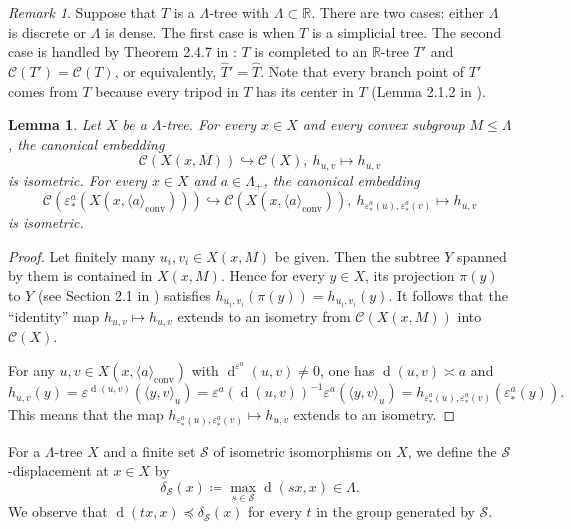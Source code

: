 \documentclass[12pt,nosumlimits,nonamelimits]{amsart}
\newtheorem{lem}[thm]{Lemma}
\theoremstyle{remark}
\newtheorem{rem}[thm]{Remark}
\theoremstyle{definition}
\newcommand{\IR}{\mathbb{R}}
\newcommand{\cC}{\mathcal{C}}
\newcommand{\cS}{\mathcal{S}}
\newcommand{\ve}{\varepsilon}
\newcommand{\La}{\Lambda}
\DeclareMathOperator{\dist}{d}
\DeclareMathOperator{\conv}{conv}
\newcommand{\ip}[1]{\mathopen{\langle}#1\mathclose{\rangle}}
\begin{document}
\begin{rem}\label{rem:Qtree}
Suppose that $T$ is a $\La$-tree with $\La\subset\IR$. 
There are two cases: either $\La$ is discrete or $\La$ is dense. 
The first case is when $T$ is a simplicial tree. 
The second case is handled by Theorem 2.4.7 in \cite{chiswell}: $T$ 
is completed to an $\IR$-tree $T'$ and 
$\cC(T') = \cC(T)$, or equivalently, $\hat{T}' = \hat{T}$.  
Note that every branch point of $T'$ comes from $T$ 
because every tripod in $T$ has its center in $T$ 
(Lemma 2.1.2 in \cite{chiswell}).
\end{rem}

\begin{lem}\label{lem:treeemb2}
Let $X$ be a $\La$-tree. 
For every $x\in X$ and every convex subgroup $M\le\La$, 
the canonical embedding
\[
\cC(X(x,M)) \hookrightarrow \cC(X),\ 
h_{u,v}\mapsto h_{u,v}
\]
is isometric. 
For every $x\in X$ and $a\in\La_+$, the canonical embedding
\[
\cC(\ve^a_* (X(x,\ip{a}_{\conv}))) \hookrightarrow \cC(X(x,\ip{a}_{\conv})),\ 
h_{\ve^a_*(u),\ve^a_*(v)}\mapsto h_{u,v}
\]
is isometric. 
\end{lem}
\begin{proof}
Let finitely many $u_i,v_i\in X(x,M)$ be given. 
Then the subtree $Y$ spanned by them is contained 
in $X(x,M)$. 
Hence for every $y \in X$, its projection $\pi(y)$ to $Y$ 
(see Section 2.1 in \cite{chiswell})
satisfies $h_{u_i,v_i}(\pi(y)) = h_{u_i,v_i}(y)$.
It follows that the ``identity'' map $h_{u,v}\mapsto h_{u,v}$ 
extends to an isometry from $\cC(X(x,M))$ 
into $\cC(X)$. 

For any $u,v\in X(x,\ip{a}_{\conv})$ with $\dist^{\ve^a}(u,v)\neq0$, 
one has $\dist(u,v)\asymp a$ and 
\[
h_{u,v}(y) = \ve^{\dist(u,v)} (\ip{y,v}_u) 
 = \ve^{a}(\dist(u,v))^{-1} \ve^{a} (\ip{y,v}_u) 
 = h_{\ve^a_*(u),\ve^a_*(v)}(\ve^a_*(y)).
\] 
This means that the map $h_{\ve^a_*(u),\ve^a_*(v)}\mapsto h_{u,v}$ 
extends to an isometry. 
\end{proof}


%
For a $\La$-tree $X$ and a finite set $\cS$ of 
isometric isomorphisms on $X$, 
we define the $\cS$-dis\-place\-ment at $x\in X$ by 
\[
\delta_{\cS}(x) \coloneq \max_{s\in\cS}\dist(sx,x) \in \La.
\]
We observe that $\dist(tx,x) \preceq \delta_{\cS}(x)$ 
for every $t$ in the group generated by $\cS$. 
\end{document}
